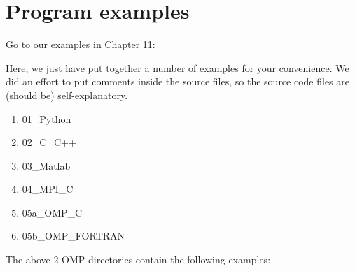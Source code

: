 \chapter{Program examples}

Go to our examples in Chapter 11:
\begin{prompt}
$ %
\end{prompt}

Here, we just have put together a number of examples for your convenience.
We did an effort to put comments inside the source files, so the source code files are (should be) self-explanatory.

\begin{enumerate}
\item  01\_Python
\item  02\_C\_C++
\item  03\_Matlab
\item  04\_MPI\_C
\item  05a\_OMP\_C
\item  05b\_OMP\_FORTRAN
\end{enumerate}

The above 2 OMP directories contain the following examples:

